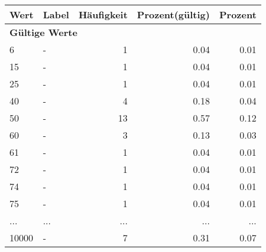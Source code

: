      \begin{longtable}{lXrrr}
     \toprule
     \textbf{Wert} & \textbf{Label} & \textbf{Häufigkeit} & \textbf{Prozent(gültig)} & \textbf{Prozent} \\
     \endhead
     \midrule
     \multicolumn{5}{l}{\textbf{Gültige Werte}}\\
        6 & \multicolumn{1}{X}{-} & %
          \num{1} &
          \num[round-mode=places,round-precision=2]{0,04} &
          \num[round-mode=places,round-precision=2]{0,01} \\
        15 & \multicolumn{1}{X}{-} & %
          \num{1} &
          \num[round-mode=places,round-precision=2]{0,04} &
          \num[round-mode=places,round-precision=2]{0,01} \\
        25 & \multicolumn{1}{X}{-} & %
          \num{1} &
          \num[round-mode=places,round-precision=2]{0,04} &
          \num[round-mode=places,round-precision=2]{0,01} \\
        40 & \multicolumn{1}{X}{-} & %
          \num{4} &
          \num[round-mode=places,round-precision=2]{0,18} &
          \num[round-mode=places,round-precision=2]{0,04} \\
        50 & \multicolumn{1}{X}{-} & %
          \num{13} &
          \num[round-mode=places,round-precision=2]{0,57} &
          \num[round-mode=places,round-precision=2]{0,12} \\
        60 & \multicolumn{1}{X}{-} & %
          \num{3} &
          \num[round-mode=places,round-precision=2]{0,13} &
          \num[round-mode=places,round-precision=2]{0,03} \\
        61 & \multicolumn{1}{X}{-} & %
          \num{1} &
          \num[round-mode=places,round-precision=2]{0,04} &
          \num[round-mode=places,round-precision=2]{0,01} \\
        72 & \multicolumn{1}{X}{-} & %
          \num{1} &
          \num[round-mode=places,round-precision=2]{0,04} &
          \num[round-mode=places,round-precision=2]{0,01} \\
        74 & \multicolumn{1}{X}{-} & %
          \num{1} &
          \num[round-mode=places,round-precision=2]{0,04} &
          \num[round-mode=places,round-precision=2]{0,01} \\
        75 & \multicolumn{1}{X}{-} & %
          \num{1} &
          \num[round-mode=places,round-precision=2]{0,04} &
          \num[round-mode=places,round-precision=2]{0,01} \\
       ... & ... & ... & ... & ... \\
        10000 & \multicolumn{1}{X}{-} & %
          \num{7} &
          \num[round-mode=places,round-precision=2]{0,31} &
          \num[round-mode=places,round-precision=2]{0,07} \\


\end{longtable}
